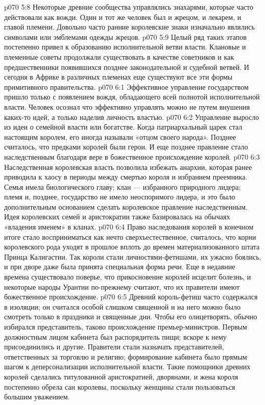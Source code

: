\vs p070 5:8 Некоторые древние сообщества управлялись знахарями, которые часто действовали как вожди. Один и тот же человек был и жрецом, и лекарем, и главой племени. Довольно часто ранние королевские знаки изначально являлись символами или эмблемами одежды жрецов.
\vs p070 5:9 Целый ряд таких этапов постепенно привел к образованию исполнительной ветви власти. Клановые и племенные советы продолжали существовать в качестве советников и как предшественники появившихся позднее законодательной и судебной ветвей. И сегодня в Африке в различных племенах еще существуют все эти формы примитивного правительства.
\vs p070 6:1 Эффективное управление государством пришло только с появлением вождя, обладающего всей полнотой исполнительной власти. Человек осознал что эффективно управлять можно не путем внушения каких\hyp{}то идей, а только наделив личность властью.
\vs p070 6:2 Управление выросло из идеи о семейной власти или богатстве. Когда патриархальный царек стал настоящим королем, его иногда называли «отцом своего народа». Позднее считалось, что предками королей были герои. И еще позднее правление стало наследственным благодаря вере в божественное происхождение королей.
\vs p070 6:3 Наследственная королевская власть позволила избежать анархии, которая ранее приводила к хаосу в периоды между смертью короля и избранием преемника. Семья имела биологического главу; клан --- избранного природного лидера; племя и, позднее, государство не имело неоспоримого лидера, и это было дополнительным основанием сделать королевское правление наследственным. Идея королевских семей и аристократии также базировалась на обычаях «владения именем» в кланах.
\vs p070 6:4 Право наследования королей в конечном итоге стало восприниматься как нечто сверхъестественное, считалось, что корни королевского рода уходят в прошлое вплоть до времен материализованного штата Принца Калигастии. Так короли стали личностями\hyp{}фетишами, их ужасно боялись, и при дворе даже была принята специальная форма речи. Еще в недавние времена существовало поверье, что прикосновение королей исцелит болезнь, и некоторые народы Урантии по\hyp{}прежнему считают, что их правители имеют божественное происхождение.
\vs p070 6:5 Древний король\hyp{}фетиш часто содержался в изоляции; он считался особой слишком священной и на него можно было смотреть только в праздники и священные дни. Чтобы его олицетворять, обычно избирался представитель, таково происхождение премьер\hyp{}министров. Первым должностным лицом кабинета был распорядитель пищи; вскоре к нему присоединились и другие. Правители стали назначать представителей, ответственных за торговлю и религию; формирование кабинета было прямым шагом к деперсонализации исполнительной власти. Такие помощники древних королей сделались титулованной аристократией, дворянами, и жена короля постепенно обрела сан королевы, поскольку женщины стали пользоваться большим уважением.
